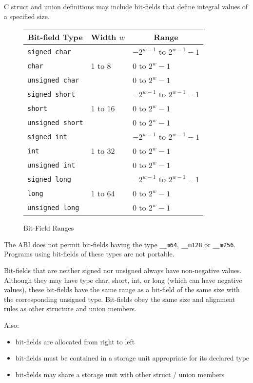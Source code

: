 C struct and union definitions may include bit-fields that define
integral values of a specified size.

\begin{figure}[h]
\Hrule
  \caption{Bit-Field Ranges}
  \begin{center}
    \leavevmode
    \begin{tabular}{l|l|l}
      \multicolumn{1}{c}{Bit-field Type}
         & \multicolumn{1}{c}{Width $w$}
         & \multicolumn{1}{c}{Range} \\
      \hline
      \texttt{signed char} & & $-2^{w - 1}$ to $2^{w-1}-1$ \\
      \texttt{char} & 1 to 8 & 0 to $2^{w}-1$ \\
      \texttt{unsigned char} & & 0 to $2^{w}-1$ \\
      \hline
      \texttt{signed short} & & $-2^{w - 1}$ to $2^{w-1}-1$ \\
      \texttt{short} & 1 to 16 & 0 to $2^{w}-1$ \\
      \texttt{unsigned short} & & 0 to $2^{w}-1$ \\
      \hline
      \texttt{signed int} & & $-2^{w - 1}$ to $2^{w-1}-1$ \\
      \texttt{int} & 1 to 32 & 0 to $2^{w}-1$ \\
      \texttt{unsigned int} & & 0 to $2^{w}-1$ \\
      \hline
      \texttt{signed long} & & $-2^{w - 1}$ to $2^{w-1}-1$ \\
      \texttt{long} & 1 to 64 & 0 to $2^{w}-1$ \\
      \texttt{unsigned long} & & 0 to $2^{w}-1$ \\
    \end{tabular}
  \end{center}
\Hrule
\end{figure}

The ABI does not permit bit-fields having the type \texttt{__m64},
\texttt{__m128} or \texttt{__m256}.  Programs using bit-fields of
these types are not portable.

Bit-fields that are neither signed nor unsigned
always have non-negative values. Although they may have type char,
short, int, or long (which can have negative values), these bit-fields
have the same range as a bit-field of the same size with the
corresponding unsigned type. Bit-fields obey the same size and
alignment rules as other structure and union members.

Also:
\begin{itemize}
 \item bit-fields are allocated from right to left
 \item bit-fields must be contained in a storage unit appropriate 
       for its declared type
 \item bit-fields may share a storage unit with other struct / union members
\end{itemize}

